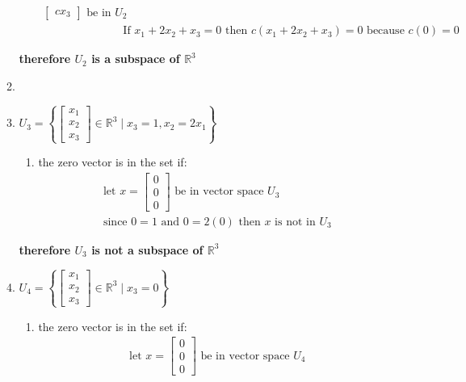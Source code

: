\documentclass[11pt]{article}
\begin{document}
\begin{enumerate}
\begin{enumerate}
\begin{enumerate}
\[\begin{aligned}
\begin{bmatrix}
                cx_3
            \end{bmatrix} \text{ be in } U_2 \\
            &\text{If } x_1 + 2x_2 + x_3 = 0 \text{ then } c(x_1 + 2x_2 + x_3) = 0 \text{ because } c(0) = 0
        \end{aligned}
        \]
    \end{enumerate}
    \textbf{therefore \( U_2 \) is a subspace of \( \mathbb{R}^3 \)}
    \item \item \( U_3 = \left\{ \begin{bmatrix}
        x_1 \\
        x_2 \\
        x_3
        \end{bmatrix} \in \mathbb{R}^3 \mid x_3 = 1, x_2 = 2x_1 \right\} \)
    \begin{enumerate}
        \item the zero vector is in the set if:
        \[
        \begin{aligned}
            &\text{let } x = \begin{bmatrix}
                0 \\
                0 \\
                0
            \end{bmatrix} \text{ be in vector space } U_3 \\
            &\text{since } 0 = 1 \text{ and } 0 = 2(0) \text{ then } x \text{ is not in } U_3
        \end{aligned}
        \]
    \end{enumerate}
    \textbf{therefore \( U_3 \) is not a subspace of \( \mathbb{R}^3 \)}
    \item \( U_4 = \left\{ \begin{bmatrix}
    x_1 \\
    x_2 \\
    x_3
    \end{bmatrix} \in \mathbb{R}^3 \mid x_3 = 0 \right\} \)
    \begin{enumerate}
        \item the zero vector is in the set if:
        \[
        \begin{aligned}
            &\text{let } x = \begin{bmatrix}
                0 \\
                0 \\
                0
            \end{bmatrix} \text{ be in vector space } U_4 \\

\end{aligned}\]
\end{enumerate}
\end{enumerate}
\end{enumerate}
\end{document}
